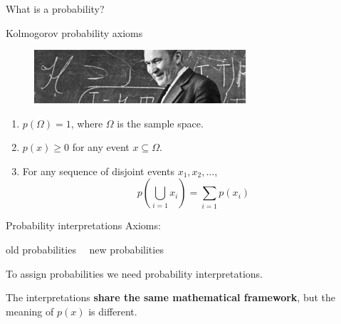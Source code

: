 \documentclass[
aspectratio=169,
14pt,
professionalfonts
]{beamer}
\newcommand{\arrow}{~\ding{220}~}
\begin{document}
\begin{frame}
\centering
\Large
What is a probability?
\end{frame}

\begin{frame}{Kolmogorov probability axioms}
\begin{figure}
    \centering
    \includegraphics[width=0.7\textwidth]{../plots/kolmogorov.jpg}
\end{figure}
\begin{enumerate}
  \item $ p(\Omega) = 1 $, where \( \Omega \) is the sample space.
  \item $ p(x) \geq 0 $ for any event \( x \subseteq \Omega \).
  \item For any sequence of disjoint events \( x_1, x_2, \dots \),
        $$
        p\left( \bigcup_{i=1} x_i \right) = \sum_{i=1} p(x_i)
        $$
\end{enumerate}
\end{frame}




\begin{frame}{Probability interpretations}
    Axioms:
    \begin{center}
        old probabilities \arrow new probabilities
    \end{center}
    
    \vspace{0.5cm}
    To assign probabilities we need probability interpretations.

    \vspace{0.5cm}
    The interpretations \textbf{share the same mathematical framework}, but the meaning of $p(x)$ is different.
\end{frame}
\end{document}
